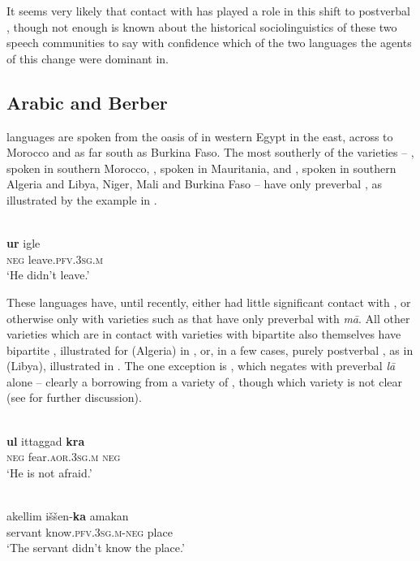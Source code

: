 \documentclass[output=paper]{langsci/langscibook}
\begin{document}
It seems very likely that contact with   has played a role in this shift to postverbal , though not enough is known about the historical sociolinguistics of these two speech communities to say with confidence which of the two languages the agents of this change were dominant in.



\subsection{Arabic and Berber}


 languages are spoken from the oasis of  in western Egypt in the east, across to Morocco and as far south as Burkina Faso. The most southerly of the  varieties – , spoken in southern Morocco, , spoken in Mauritania, and , spoken in southern Algeria and Libya, Niger, {Mali} and Burkina Faso – have only preverbal , as illustrated by the  example in .


\ea\label{tua}
{        \citep[10]{Chaker1996}}\\
\gll \textbf{ur} igle\\
     \textsc{neg} leave\textsc{.pfv.3sg.m}\\
\glt ‘He didn’t leave.’
\z

These languages have, until recently, either had little significant contact with , or otherwise only with varieties such as  that have only preverbal  with \textit{mā}. All other  varieties which are in contact with  varieties with bipartite  also themselves have bipartite , illustrated for  (Algeria) in , or, in a few cases, purely postverbal , as in  (Libya), illustrated in . The one exception is , which negates with preverbal \textit{lā} alone – clearly a borrowing from a variety of , though which variety is not clear (see \citealt{Souag2009} for further discussion).

\ea\label{kab}
{        \citep[25]{Rabhi1996}}\\
\gll \textbf{ul} ittaggad \textbf{kra}\\
     \textsc{neg} fear.\textsc{aor.3sg.m} \textsc{neg}\\
\glt ‘He is not afraid.’
\z

\ea\label{awjneg}
{        \citep[82]{Paradisi1961}}\\
\gll akellim iššen-\textbf{ka} amakan \\
     servant know\textsc{.pfv.3sg.m-neg} place\\
\glt ‘The servant didn’t know the place.’
\z
\end{document}
